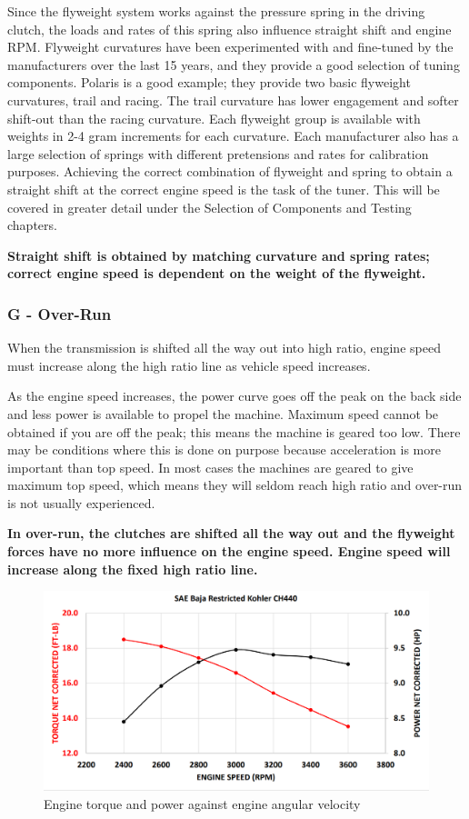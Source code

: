 \documentclass[12pt, titlepage]{article}
\begin{document}
Since the flyweight system works against the pressure spring in the driving clutch, the loads and rates of this spring also influence straight shift and engine RPM. Flyweight curvatures have been experimented with and fine-tuned by the manufacturers over the last 15 years, and they provide a good selection of tuning components. Polaris is a good example; they provide two basic flyweight curvatures, trail and racing. The trail curvature has lower engagement and softer shift-out than the racing curvature. Each flyweight group is available with weights in 2-4 gram increments for each curvature. Each manufacturer also has a large selection of springs with different pretensions and rates for calibration purposes. Achieving the correct combination of flyweight and spring to obtain a straight shift at the correct engine speed is the task of the tuner. This will be covered in greater detail under the Selection of Components and Testing chapters.

\textbf{Straight shift is obtained by matching curvature and spring rates; correct engine speed is dependent on the weight of the flyweight.}

\subsubsection*{G - Over-Run}

When the transmission is shifted all the way out into high ratio, engine speed must increase along the high ratio line as vehicle speed increases.

As the engine speed increases, the power curve goes off the peak on the back side and less power is available to propel the machine. Maximum speed cannot be obtained if you are off the peak; this means the machine is geared too low. There may be conditions where this is done on purpose because acceleration is more important than top speed. In most cases the machines are geared to give maximum top speed, which means they will seldom reach high ratio and over-run is not usually experienced.

\textbf{In over-run, the clutches are shifted all the way out and the flyweight forces have no more influence on the engine speed. Engine speed will increase along the fixed high ratio line.} \citet{Aaen2007}

\begin{figure}[H]
  \centering
  \includegraphics[width=\textwidth]{graphs/engine.png}
  \caption{Engine torque and power against engine angular velocity \citet{BajaSAEKohlerEngine2022}}
  \label{fig:engine_graph}
\end{figure}
\end{document}
